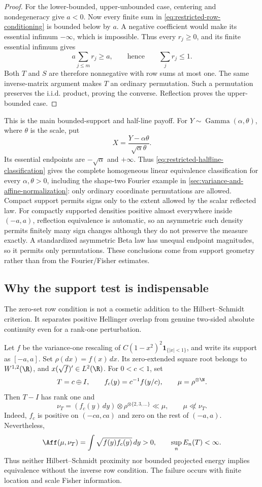 \begin{proof}
For the lower-bounded, upper-unbounded case, centering and
nondegeneracy give \(a<0\).
Now every finite sum in \eqref{eq:restricted-row-conditioning}
is bounded below by \(a\).
A negative coefficient would make its essential infimum
\(-\infty\), which is impossible.
Thus every \(r_j\geq0\), and its finite essential infimum gives
\[
 a\sum_{j\leq m}r_j\geq a,
 \qquad\text{hence}\qquad \sum_jr_j\leq1.
\]
Both \(T\) and \(S\) are therefore nonnegative with row sums at
most one.
The same inverse-matrix argument makes \(T\) an ordinary
permutation.
Such a permutation preserves the i.i.d. product, proving the
converse.
Reflection proves the upper-bounded case.
\end{proof}

This is the main bounded-support and half-line payoff.
For \(Y\sim\operatorname{Gamma}(\alpha,\theta)\), where \(\theta\)
is the scale, put
\[
 X=\frac{Y-\alpha\theta}{\sqrt{\alpha}\theta}.
\]
Its essential endpoints are \(-\sqrt{\alpha}\) and \(+\infty\).
Thus \eqref{eq:restricted-halfline-classification} gives the complete
homogeneous linear equivalence classification for every
\(\alpha,\theta>0\), including the shape-two Fourier example in
\cref{sec:variance-and-affine-normalization}: only ordinary coordinate
permutations are allowed.
Compact support permits signs only to the extent allowed by the scalar
reflected law.
For compactly supported densities positive almost everywhere inside
\((-a,a)\), reflection equivalence is automatic, so an asymmetric such
density permits finitely many sign changes although they do not preserve the
measure exactly.
A standardized asymmetric Beta law has unequal endpoint magnitudes, so it
permits only permutations.
These conclusions come from support geometry rather than from the
Fourier/Fisher estimates.

\subsection{Why the support test is indispensable}
\label{sec:restricted-counterexample}

The zero-set row condition is not a cosmetic addition to the
Hilbert--Schmidt criterion.
It separates positive Hellinger overlap from genuine two-sided absolute
continuity even for a rank-one perturbation.

Let \(f\) be the variance-one rescaling of
\(C(1-x^2)^2\mathbf 1_{\{|x|<1\}}\), and write its support as
\([-a,a]\).
Set \(\rho(dx)=f(x)\,dx\).
Its zero-extended square root belongs to \(W^{1,2}(\R)\), and
\(x(\sqrt f)'\in L^2(\R)\).
For \(0<c<1\), set
\[
 T=c\oplus I,\qquad
 f_c(y)=c^{-1}f(y/c),\qquad \mu=\rho^{\otimes\N}.
\]
Then \(T-I\) has rank one and
\[
 \nu_T=(f_c(y)\,dy)\otimes\rho^{\otimes\{2,3,\ldots\}}\ll\mu,
 \qquad \mu\not\ll\nu_T.
\]
Indeed, \(f_c\) is positive on \((-ca,ca)\) and zero on the rest
of \((-a,a)\).
Nevertheless,
\[
 \Aff(\mu,\nu_T)=\int\sqrt{f(y)f_c(y)}\,dy>0,
 \qquad \sup_n E_n(T)<\infty.
\]
Thus neither Hilbert--Schmidt proximity nor bounded projected energy
implies equivalence without the inverse row condition.
The failure occurs with finite location and scale Fisher information.


